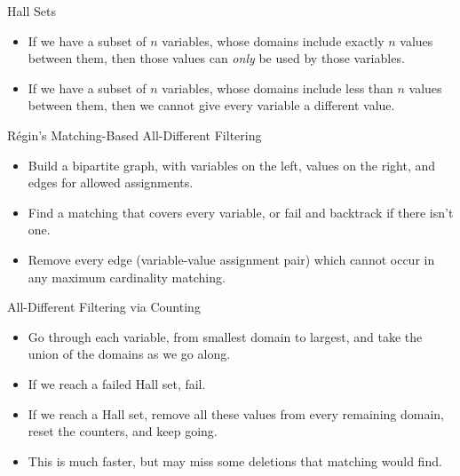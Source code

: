 \documentclass{beamer}
\begin{document}
\begin{frame}{Hall Sets}
    \begin{itemize}
        \item If we have a subset of $n$ variables, whose domains include exactly $n$ values between
            them, then those values can \emph{only} be used by those variables.

        \item If we have a subset of $n$ variables, whose domains include less than $n$ values
            between them, then we cannot give every variable a different value.
    \end{itemize}
\end{frame}


\begin{frame}{R\'egin's Matching-Based All-Different Filtering}
    \begin{itemize}
        \item Build a bipartite graph, with variables on the left, values on
            the right, and edges for allowed assignments.

        \item Find a matching that covers every variable, or fail and backtrack if there isn't
            one.

        \item Remove every edge (variable-value assignment pair) which cannot occur in any
            maximum cardinality matching.
    \end{itemize}
\end{frame}

\begin{frame}{All-Different Filtering via Counting}
    \begin{itemize}
        \item Go through each variable, from smallest domain to largest, and take the union of
            the domains as we go along.

        \item If we reach a failed Hall set, fail.

        \item If we reach a Hall set, remove all these values from every remaining domain, reset
            the counters, and keep going.

        \item This is much faster, but may miss some deletions that matching would find.
    \end{itemize}
\end{frame}
\end{document}
